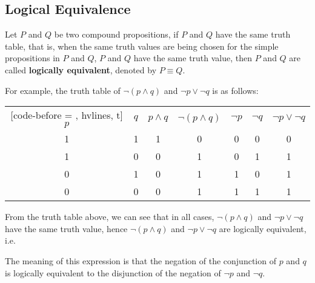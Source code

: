 \documentclass{report}
\begin{document}
\subsection*{Logical Equivalence}

Let $P$ and $Q$ be two compound propositions, if $P$ and $Q$ have the same
truth table, that is, when the same truth values are being chosen for the
simple propositions in $P$ and $Q$, $P$ and $Q$ have the same truth value, then
$P$ and $Q$ are called \textbf{logically equivalent}, denoted by $P \equiv Q$.

For example, the truth table of $\neg (p \land q)$ and $\neg p \lor \neg q$ is
as follows:
\begin{center}
    \begin{NiceTabular}{|c|c|c|c|c|c|c|}[code-before = , hvlines, t]
        $p$ & $q$ & $p \land q$ & $\neg(p \land q)$ & $\neg p$ & $\neg q$ & $\neg p \lor \neg q$ \\
        1   & 1   & 1           & 0                 & 0        & 0        & 0                    \\
        1   & 0   & 0           & 1                 & 0        & 1        & 1                    \\
        0   & 1   & 0           & 1                 & 1        & 0        & 1                    \\
        0   & 0   & 0           & 1                 & 1        & 1        & 1                    \\
    \end{NiceTabular}
\end{center}

From the truth table above, we can see that in all cases, $\neg (p \land q)$
and $\neg p \lor \neg q$ have the same truth value, hence $\neg (p \land q)$
and $\neg p \lor \neg q$ are logically equivalent, i.e. \noindent

\begin{center}
\end{center}

The meaning of this expression is that the negation of the conjunction of $p$
and $q$ is logically equivalent to the disjunction of the negation of $\neg p$
and $\neg q$.
\end{document}
